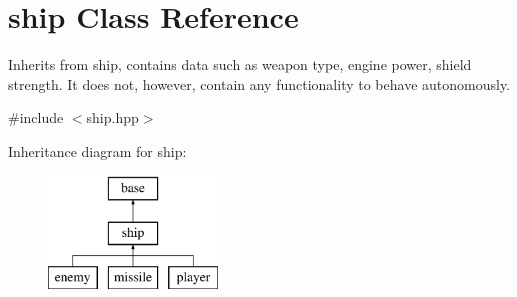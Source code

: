 \hypertarget{classship}{\section{ship Class Reference}
\label{classship}
}


Inherits from ship, contains data such as weapon type, engine power, shield strength. It does not, however, contain any functionality to behave autonomously.  




{\ttfamily \#include $<$ship.\-hpp$>$}

Inheritance diagram for ship\-:\begin{figure}[H]
\begin{center}
\leavevmode
\includegraphics[height=3.000000cm]{classship}
\end{center}
\end{figure}
